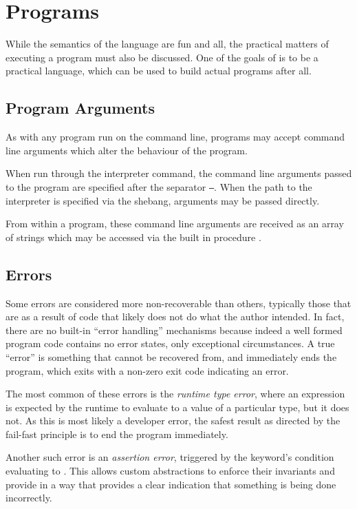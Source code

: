 \section{Programs}

While the semantics of the language are fun and all, the practical matters of
executing a program must also be discussed. One of the goals of \Trilogy{} is
to be a practical language, which can be used to build actual programs after
all.

\subsection{Program Arguments}

As with any program run on the command line, \Trilogy{} programs may accept
command line arguments which alter the behaviour of the program.

When run through the interpreter command, the command line arguments passed
to the \Trilogy{} program are specified after the separator \texttt{--}. When
the path to the \Trilogy{} interpreter is specified via the shebang, arguments
may be passed directly.

From within a \Trilogy{} program, these command line arguments are received
as an array of strings which may be accessed via the built in procedure
.

\subsection{Errors}

Some errors are considered more non-recoverable than others, typically those
that are as a result of code that likely does not do what the author intended.
In fact, there are no built-in ``error handling'' mechanisms because indeed
a well formed \Trilogy{} program code contains no error states, only exceptional
circumstances. A true ``error'' is something that cannot be recovered from, and
immediately ends the \Trilogy{} program, which exits with a non-zero exit code
indicating an error.

The most common of these errors is the \emph{runtime type error}, where an
expression is expected by the runtime to evaluate to a value of a particular
type, but it does not. As this is most likely a developer error, the safest
result as directed by the fail-fast principle is to end the program immediately.

Another such error is an \emph{assertion error}, triggered by the  keyword's
condition evaluating to . This allows custom abstractions to enforce
their invariants and provide in a way that provides a clear indication that
something is being done incorrectly.


